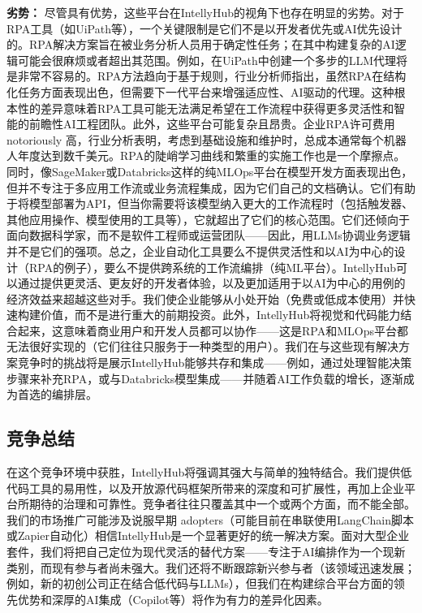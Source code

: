 \documentclass[11pt, a4paper, oneside]{article}
\begin{document}
\textbf{劣势：} 尽管具有优势，这些平台在IntellyHub的视角下也存在明显的劣势。对于RPA工具（如UiPath等），一个关键限制是它们不是以开发者优先或AI优先设计的。RPA解决方案旨在被业务分析人员用于确定性任务；在其中构建复杂的AI逻辑可能会很麻烦或者超出其范围。例如，在UiPath中创建一个多步的LLM代理将是非常不容易的。RPA方法趋向于基于规则，行业分析师指出，虽然RPA在结构化任务方面表现出色，但需要下一代平台来增强适应性、AI驱动的代理\cite{forresterRPAvsAI}。这种根本性的差异意味着RPA工具可能无法满足希望在工作流程中获得更多灵活性和智能的前瞻性AI工程团队。此外，这些平台可能复杂且昂贵。企业RPA许可费用 notoriously 高，行业分析表明，考虑到基础设施和维护时，总成本通常每个机器人年度达到数千美元\cite{rpaPricing}。RPA的陡峭学习曲线和繁重的实施工作也是一个摩擦点。同时，像SageMaker或Databricks这样的纯MLOps平台在模型开发方面表现出色，但并不专注于多应用工作流或业务流程集成，因为它们自己的文档确认\cite{awsSagemaker}。它们有助于将模型部署为API，但当你需要将该模型纳入更大的工作流程时（包括触发器、其他应用操作、模型使用的工具等），它就超出了它们的核心范围。它们还倾向于面向数据科学家，而不是软件工程师或运营团队——因此，用LLMs协调业务逻辑并不是它们的强项。总之，企业自动化工具要么不提供灵活性和以AI为中心的设计（RPA的例子），要么不提供跨系统的工作流编排（纯ML平台）。IntellyHub可以通过提供更灵活、更友好的开发者体验，以及更加适用于以AI为中心的用例的经济效益来超越这些对手。我们使企业能够从小处开始（免费或低成本使用）并快速构建价值，而不是进行重大的前期投资。此外，IntellyHub将视觉和代码能力结合起来，这意味着商业用户和开发人员都可以协作——这是RPA和MLOps平台都无法很好实现的（它们往往只服务于一种类型的用户）。我们在与这些现有解决方案竞争时的挑战将是展示IntellyHub能够共存和集成——例如，通过处理智能决策步骤来补充RPA，或与Databricks模型集成——并随着AI工作负载的增长，逐渐成为首选的编排层。

\subsection{竞争总结}
在这个竞争环境中获胜，IntellyHub将强调其强大与简单的独特结合。我们提供低代码工具的易用性，以及开放源代码框架所带来的深度和可扩展性，再加上企业平台所期待的治理和可靠性。竞争者往往只覆盖其中一个或两个方面，而不能全部。我们的市场推广可能涉及说服早期 adopters（可能目前在串联使用LangChain脚本或Zapier自动化）相信IntellyHub是一个显著更好的统一解决方案。面对大型企业套件，我们将把自己定位为现代灵活的替代方案——专注于AI编排作为一个现新类别，而现有参与者尚未强大。我们还将不断跟踪新兴参与者（该领域迅速发展；例如，新的初创公司正在结合低代码与LLMs），但我们在构建综合平台方面的领先优势和深厚的AI集成（Copilot等）将作为有力的差异化因素。
\end{document}
